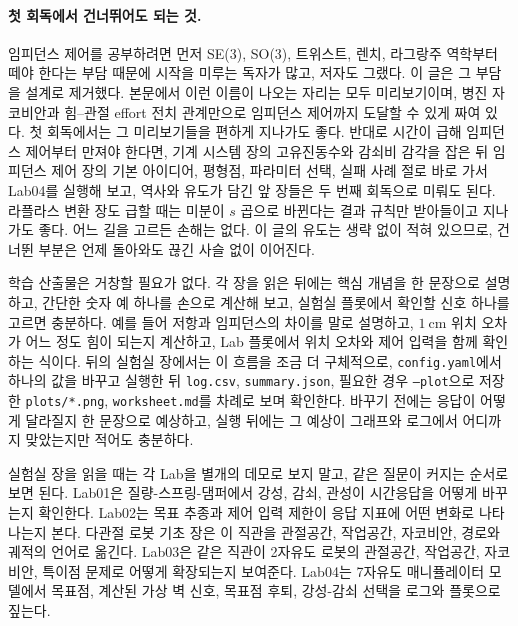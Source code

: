 \paragraph{첫 회독에서 건너뛰어도 되는 것.}
임피던스 제어를 공부하려면 먼저 SE(3), SO(3), 트위스트, 렌치, 라그랑주 역학부터 떼야 한다는 부담 때문에 시작을 미루는 독자가 많고, 저자도 그랬다.
이 글은 그 부담을 설계로 제거했다.
본문에서 이런 이름이 나오는 자리는 모두 미리보기이며, 병진 자코비안과 힘--관절 effort 전치 관계만으로 임피던스 제어까지 도달할 수 있게 짜여 있다.
첫 회독에서는 그 미리보기들을 편하게 지나가도 좋다.
%
반대로 시간이 급해 임피던스 제어부터 만져야 한다면, 기계 시스템 장의 고유진동수와 감쇠비 감각을 잡은 뒤 임피던스 제어 장의 기본 아이디어, 평형점, 파라미터 선택, 실패 사례 절로 바로 가서 Lab04를 실행해 보고, 역사와 유도가 담긴 앞 장들은 두 번째 회독으로 미뤄도 된다.
라플라스 변환 장도 급할 때는 미분이 $s$ 곱으로 바뀐다는 결과 규칙만 받아들이고 지나가도 좋다.
%
어느 길을 고르든 손해는 없다.
이 글의 유도는 생략 없이 적혀 있으므로, 건너뛴 부분은 언제 돌아와도 끊긴 사슬 없이 이어진다.
%

학습 산출물은 거창할 필요가 없다.
각 장을 읽은 뒤에는 핵심 개념을 한 문장으로 설명하고, 간단한 숫자 예 하나를 손으로 계산해 보고, 실험실 플롯에서 확인할 신호 하나를 고르면 충분하다.
예를 들어 저항과 임피던스의 차이를 말로 설명하고, $1~\mathrm{cm}$ 위치 오차가 어느 정도 힘이 되는지 계산하고, Lab 플롯에서 위치 오차와 제어 입력을 함께 확인하는 식이다.
뒤의 실험실 장에서는 이 흐름을 조금 더 구체적으로, \texttt{config.yaml}에서 하나의 값을 바꾸고 실행한 뒤 \texttt{log.csv}, \texttt{summary.json}, 필요한 경우 \texttt{--plot}으로 저장한 \texttt{plots/*.png}, \texttt{worksheet.md}를 차례로 보며 확인한다.
바꾸기 전에는 응답이 어떻게 달라질지 한 문장으로 예상하고, 실행 뒤에는 그 예상이 그래프와 로그에서 어디까지 맞았는지만 적어도 충분하다.

실험실 장을 읽을 때는 각 Lab을 별개의 데모로 보지 말고, 같은 질문이 커지는 순서로 보면 된다.
Lab01은 질량-스프링-댐퍼에서 강성, 감쇠, 관성이 시간응답을 어떻게 바꾸는지 확인한다.
Lab02는 목표 추종과 제어 입력 제한이 응답 지표에 어떤 변화로 나타나는지 본다.
다관절 로봇 기초 장은 이 직관을 관절공간, 작업공간, 자코비안, 경로와 궤적의 언어로 옮긴다.
Lab03은 같은 직관이 2자유도 로봇의 관절공간, 작업공간, 자코비안, 특이점 문제로 어떻게 확장되는지 보여준다.
Lab04는 7자유도 매니퓰레이터 모델에서 목표점, 계산된 가상 벽 신호, 목표점 후퇴, 강성-감쇠 선택을 로그와 플롯으로 짚는다.

